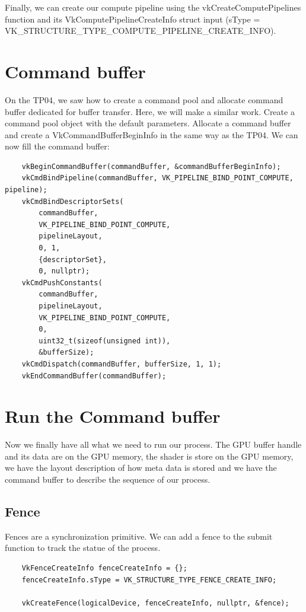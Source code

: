 \documentclass{article}
\begin{document}
Finally, we can create our compute pipeline using the vkCreateComputePipelines function and its VkComputePipelineCreateInfo struct input (sType = VK\_STRUCTURE\_TYPE\_COMPUTE\_PIPELINE\_CREATE\_INFO).

\section{Command buffer}
On the TP04, we saw how to create a command pool and allocate command buffer dedicated for buffer transfer. Here, we will make a similar work. Create a command pool object with the default parameters. Allocate a command buffer and create a VkCommandBufferBeginInfo in the same way as the TP04. We can now fill the command buffer:
\begin{lstlisting}
	vkBeginCommandBuffer(commandBuffer, &commandBufferBeginInfo);
	vkCmdBindPipeline(commandBuffer, VK_PIPELINE_BIND_POINT_COMPUTE, pipeline);
	vkCmdBindDescriptorSets(
		commandBuffer,
		VK_PIPELINE_BIND_POINT_COMPUTE,
		pipelineLayout,
		0, 1,
		{descriptorSet},
		0, nullptr);
	vkCmdPushConstants(
		commandBuffer,
		pipelineLayout,
		VK_PIPELINE_BIND_POINT_COMPUTE,
		0,
		uint32_t(sizeof(unsigned int)),
		&bufferSize);
	vkCmdDispatch(commandBuffer, bufferSize, 1, 1);
	vkEndCommandBuffer(commandBuffer);
\end{lstlisting}

\section{Run the Command buffer}
Now we finally have all what we need to run our process. The GPU buffer handle and its data are on the GPU memory, the shader is store on the GPU memory, we have the layout description of how meta data is stored and we have the command buffer to describe the sequence of our process.
\subsection{Fence}
Fences are a synchronization primitive. We can add a fence to the submit function to track the statue of the process.
\begin{lstlisting}
	VkFenceCreateInfo fenceCreateInfo = {};
	fenceCreateInfo.sType = VK_STRUCTURE_TYPE_FENCE_CREATE_INFO;

	vkCreateFence(logicalDevice, fenceCreateInfo, nullptr, &fence);
\end{lstlisting}
\end{document}
